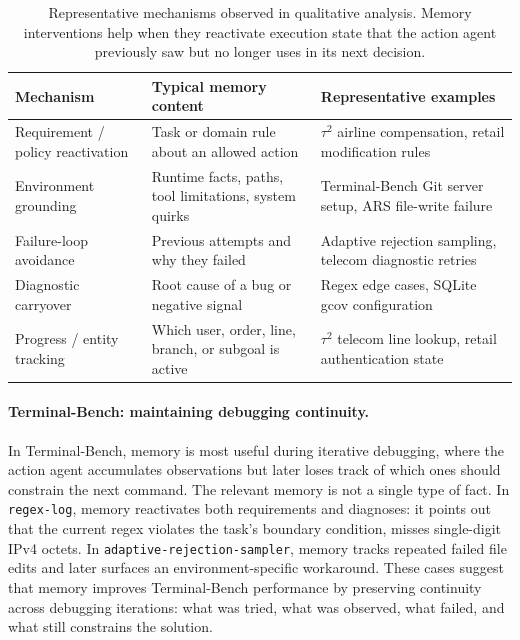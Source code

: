 \begin{table}[t]
\centering
\small
\setlength{\tabcolsep}{5pt}
\caption{
Representative mechanisms observed in qualitative analysis. Memory interventions
help when they reactivate execution state that the action agent previously saw
but no longer uses in its next decision.
}
\label{tab:qual_mechanisms}
\begin{tabularx}{\textwidth}{l X X}
\toprule
Mechanism & Typical memory content & Representative examples \\
\midrule
Requirement / policy reactivation
& Task or domain rule about an allowed action
& $\tau^2$ airline compensation, retail modification rules \\
Environment grounding
& Runtime facts, paths, tool limitations, system quirks
& Terminal-Bench Git server setup, ARS file-write failure \\
Failure-loop avoidance
& Previous attempts and why they failed
& Adaptive rejection sampling, telecom diagnostic retries \\
Diagnostic carryover
& Root cause of a bug or negative signal
& Regex edge cases, SQLite gcov configuration \\
Progress / entity tracking
& Which user, order, line, branch, or subgoal is active
& $\tau^2$ telecom line lookup, retail authentication state \\
\bottomrule
\end{tabularx}
\end{table}

\paragraph{Terminal-Bench: maintaining debugging continuity.}
In Terminal-Bench, memory is most useful during iterative debugging, where the
action agent accumulates observations but later loses track of which ones should
constrain the next command. The relevant memory is not a single type of
fact. In \texttt{regex-log}, memory reactivates both requirements and diagnoses:
it points out that the current regex violates the task's boundary condition,
misses single-digit IPv4 octets. In \texttt{adaptive-rejection-sampler}, memory
tracks repeated failed file edits and later surfaces an environment-specific
workaround. These cases suggest that memory improves Terminal-Bench performance
by preserving continuity across debugging iterations: what was tried, what was
observed, what failed, and what still constrains the solution.

